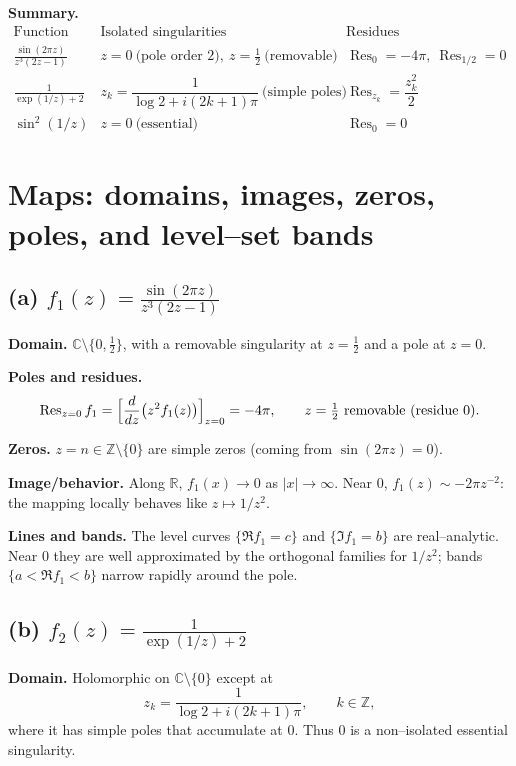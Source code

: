 \documentclass[12pt,a4paper]{article}
\begin{document}
\bigskip
\noindent\textbf{Summary.}
\[
\begin{array}{c|c|c}
	\text{Function} & \text{Isolated singularities} & \text{Residues} \\
	\hline
	\frac{\sin(2\pi z)}{z^{3}(2z-1)} & z=0\ \text{(pole order 2)},\ z=\tfrac12\ \text{(removable)}
	& \operatorname{Res}_{0}=-4\pi,\ \operatorname{Res}_{1/2}=0 \\
	\frac{1}{\exp(1/z)+2} & z_k=\dfrac{1}{\log 2+i(2k+1)\pi}\ \text{(simple poles)}
	& \operatorname{Res}_{z_k}=\dfrac{z_k^2}{2} \\
	\sin^{2}(1/z) & z=0\ \text{(essential)} & \operatorname{Res}_{0}=0
\end{array}
\]
	
	
	\section*{Maps: domains, images, zeros, poles, and level--set bands}
	
	\subsection*{(a) \(\displaystyle f_1(z)=\frac{\sin(2\pi z)}{z^{3}(2z-1)}\)}
	\textbf{Domain.} \(\mathbb C\setminus\{0,\tfrac12\}\), with a removable singularity at \(z=\tfrac12\) and a pole at \(z=0\).
	
	\textbf{Poles and residues.}
	\[
	\operatorname{Res}_{z=0} f_1
	=\Bigl[\frac{d}{dz}\bigl(z^2 f_1(z)\bigr)\Bigr]_{z=0}
	=-4\pi,
	\qquad
	z=\tfrac12 \text{ removable (residue }0).
	\]
	
	\textbf{Zeros.} \(z=n\in\mathbb Z\setminus\{0\}\) are simple zeros (coming from \(\sin(2\pi z)=0\)).
	
	\textbf{Image/behavior.} Along \(\mathbb R\), \(f_1(x)\to 0\) as \(|x|\to\infty\). Near \(0\), \(f_1(z)\sim-2\pi z^{-2}\): the mapping locally behaves like \(z\mapsto 1/z^{2}\).
	
	\textbf{Lines and bands.} The level curves \(\{\Re f_1=c\}\) and \(\{\Im f_1=b\}\) are real--analytic. Near \(0\) they are well approximated by the orthogonal families for \(1/z^2\); bands \(\{a<\Re f_1<b\}\) narrow rapidly around the pole.
	
	\bigskip
	
	\subsection*{(b) \(\displaystyle f_2(z)=\frac{1}{\exp(1/z)+2}\)}
	\textbf{Domain.} Holomorphic on \(\mathbb C\setminus\{0\}\) except at
	\[
	z_k=\frac{1}{\log 2+i(2k+1)\pi},\qquad k\in\mathbb Z,
	\]
	where it has simple poles that accumulate at \(0\). Thus \(0\) is a non--isolated essential singularity.
	
\end{document}
